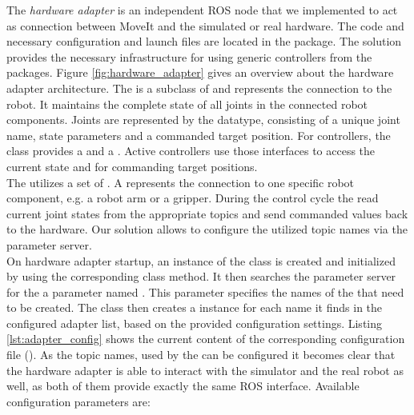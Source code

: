 The \emph{hardware adapter} is an independent ROS node that we implemented to act as connection between MoveIt and the simulated or real hardware. The code and necessary configuration and launch files are located in the  package. The solution provides the necessary infrastructure for using generic controllers from the  packages. Figure \ref{fig:hardware_adapter} gives an overview about the hardware adapter architecture. The  is a subclass of  and represents the connection to the robot. It maintains the complete state of all joints in the connected robot components. Joints are represented by the  datatype, consisting of a unique joint name, state parameters and a commanded target position. For controllers, the  class provides a  and a . Active controllers use those interfaces to access the current state and for commanding target positions. \\ 

The  utilizes a set of . A  represents the connection to one specific robot component, e.g. a robot arm or a gripper. During the control cycle the  read current joint states from the appropriate topics and send commanded values back to the hardware. Our solution allows to configure the utilized topic names via the parameter server.\\

On hardware adapter startup, an instance of the  class is created and initialized by using the corresponding class method. It then searches the parameter server for the a parameter named . This parameter specifies the names of the  that need to be created. The  class then creates a  instance for each name it finds in the configured adapter list, based on the provided configuration settings. Listing \ref{lst:adapter_config} shows the current content of the corresponding configuration file (). As the topic names, used by the  can be configured it becomes clear that the hardware adapter is able to interact with the simulator and the real robot as well, as both of them provide exactly the same ROS interface. Available configuration parameters are:

